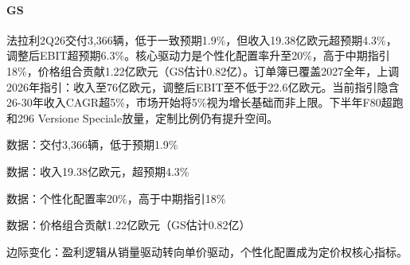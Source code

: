 \documentclass[11pt]{ctexart}
\begin{document}
\paragraph{GS} 法拉利2Q26交付3,366辆，低于一致预期1.9\%，但收入19.38亿欧元超预期4.3\%，调整后EBIT超预期6.3\%。核心驱动力是个性化配置率升至20\%，高于中期指引18\%，价格组合贡献1.22亿欧元（GS估计0.82亿）。订单簿已覆盖2027全年，上调2026年指引：收入至76亿欧元，调整后EBIT至不低于22.6亿欧元。当前指引隐含26-30年收入CAGR超5\%，市场开始将5\%视为增长基础而非上限。下半年F80超跑和296 Versione Speciale放量，定制比例仍有提升空间。
{\small\color{refgray}数据：交付3,366辆，低于预期1.9\%\par}
{\small\color{refgray}数据：收入19.38亿欧元，超预期4.3\%\par}
{\small\color{refgray}数据：个性化配置率20\%，高于中期指引18\%\par}
{\small\color{refgray}数据：价格组合贡献1.22亿欧元（GS估计0.82亿）\par}
{\small\color{refgray}边际变化：盈利逻辑从销量驱动转向单价驱动，个性化配置成为定价权核心指标。\par}
\end{document}
